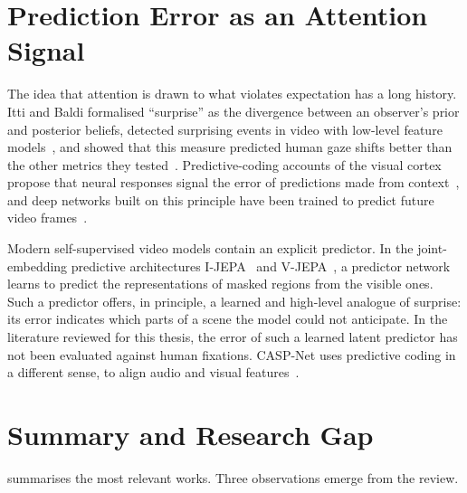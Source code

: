 \section{Prediction Error as an Attention Signal}\label{sec:related-surprise}

The idea that attention is drawn to what violates expectation has a long
history. Itti and Baldi formalised \enquote{surprise} as the divergence between
an observer's prior and posterior beliefs, detected surprising events in video
with low-level feature models~\cite{itti2005principled}, and showed that this
measure predicted human gaze shifts better than the other metrics they
tested~\cite{itti2009bayesian}. Predictive-coding accounts of the visual
cortex propose that neural responses signal the error of predictions made from
context~\cite{rao1999predictive}, and deep networks built on this principle have
been trained to predict future video frames~\cite{lotter2017deep}.

Modern self-supervised video models contain an explicit predictor. In the
joint-embedding predictive architectures I-\acrshort{JEPA}~\cite{assran2023self} and
\acrshort{V-JEPA}~\cite{bardes2024revisiting}, a predictor network learns to predict the
representations of masked regions from the visible ones. Such a predictor
offers, in principle, a learned and high-level analogue of surprise: its error
indicates which parts of a scene the model could not anticipate. In the
literature reviewed for this thesis, the error of such a learned latent
predictor has not been evaluated against human fixations. CASP-Net uses
predictive coding in a different sense, to align audio and visual
features~\cite{xiong2023casp}.

\section{Summary and Research Gap}\label{sec:gap}

 summarises the most relevant works. Three observations
emerge from the review.


